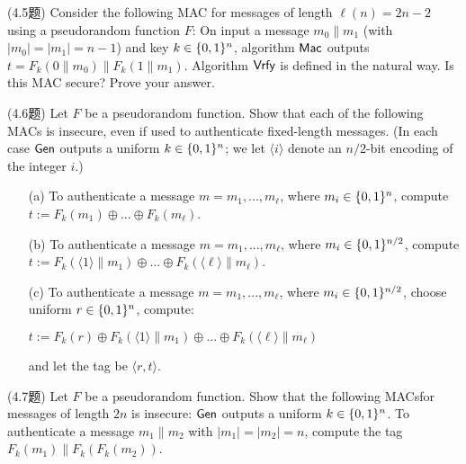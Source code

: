 \begin{questions}
    \question (4.5题) Consider the following MAC for messages of length $\ell(n)=2n-2$ using a pseudorandom function $F$: On input a message $m_0\parallel{m_1}$ (with $|m_0|=|m_1|=n-1$) and key $k\in\{{0,1}\}^n$, algorithm $\mathsf{Mac}$ outputs $t=F_k(0\parallel{m_0})\parallel{F_k}(1\parallel{m_1})$. Algorithm $\mathsf{Vrfy}$ is defined in the natural way. Is this MAC secure? Prove your answer.

        \begin{solution}
        \end{solution}

    \question (4.6题) Let $F$ be a pseudorandom function. Show that each of the following MACs is insecure, even if used to authenticate fixed-length messages. (In each case $\mathsf{Gen}$ outputs a uniform $k\in\{{0,1}\}^n$; we let $\langle{i}\rangle$ denote an $n/2$-bit encoding of the integer $i$.)

        \begin{enumerate}
            \item[(a)] To authenticate a message $m=m_1,...,m_\ell$, where $m_i\in\{{0,1}\}^n$, compute $t:=F_k(m_1)\oplus{...}\oplus{F_k}(m_\ell)$.
            \item[(b)] To authenticate a message $m=m_1,...,m_\ell$, where $m_i\in\{{0,1}\}^{n/2}$, compute $t:=F_k(\langle{1}\rangle\parallel{m_1})\oplus{...}\oplus{F_k}(\langle\ell\rangle\parallel{m_\ell})$.
            \item[(c)] To authenticate a message $m=m_1,...,m_\ell$, where $m_i\in\{{0,1}\}^{n/2}$, choose uniform $r\in\{{0,1}\}^n$, compute:
                \begin{center}
                    $t:=F_k(r)\oplus{F_k}(\langle{1}\rangle\parallel{m_1})\oplus{...}\oplus{F_k}(\langle\ell\rangle\parallel{m_\ell})$
                \end{center}
                and let the tag be $\langle{r,t}\rangle$.
        \end{enumerate}

        \begin{solution}
        \end{solution}

    \question (4.7题) Let $F$ be a pseudorandom function. Show that the following MACsfor messages of length $2n$ is insecure: $\mathsf{Gen}$ outputs a uniform $k\in\{{0,1}\}^n$. To authenticate a message $m_1\parallel{m_2}$ with $|m_1|=|m_2|=n$, compute the tag $F_k(m_1)\parallel{F_k}(F_k(m_2))$.


\end{questions}
